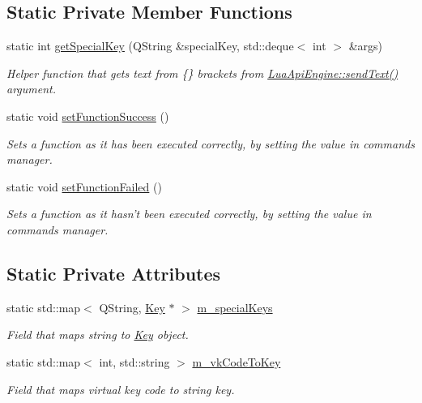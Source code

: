 \subsection*{Static Private Member Functions}
\begin{DoxyCompactItemize}
\item 
static int \hyperlink{class_lua_api_engine_ac1b8a6a2ea07065dc1c3f7eed7937d8d}{get\-Special\-Key} (Q\-String \&special\-Key, std\-::deque$<$ int $>$ \&args)
\begin{DoxyCompactList}\small\item\em Helper function that gets text from \{\} brackets from \hyperlink{class_lua_api_engine_a396ae61c3f7c771f5fe06584cef15169}{Lua\-Api\-Engine\-::send\-Text()} argument. \end{DoxyCompactList}\item 
static void \hyperlink{class_lua_api_engine_aaf7a65845f4463e07ca453362e6f3879}{set\-Function\-Success} ()
\begin{DoxyCompactList}\small\item\em Sets a function as it has been executed correctly, by setting the value in commands manager. \end{DoxyCompactList}\item 
static void \hyperlink{class_lua_api_engine_ad3fe8cc05d66d4fd61266b2f992caeda}{set\-Function\-Failed} ()
\begin{DoxyCompactList}\small\item\em Sets a function as it hasn't been executed correctly, by setting the value in commands manager. \end{DoxyCompactList}\end{DoxyCompactItemize}
\subsection*{Static Private Attributes}
\begin{DoxyCompactItemize}
\item 
static std\-::map$<$ Q\-String, \hyperlink{class_key}{Key} $\ast$ $>$ \hyperlink{class_lua_api_engine_a9fdba2d7f2f8d051453b5d1561435f5e}{m\-\_\-special\-Keys}
\begin{DoxyCompactList}\small\item\em Field that maps string to \hyperlink{class_key}{Key} object. \end{DoxyCompactList}\item 
static std\-::map$<$ int, std\-::string $>$ \hyperlink{class_lua_api_engine_a7578ac36e34620f441fd9f828663c36c}{m\-\_\-vk\-Code\-To\-Key}
\begin{DoxyCompactList}\small\item\em Field that maps virtual key code to string key. \end{DoxyCompactList}\end{DoxyCompactItemize}


